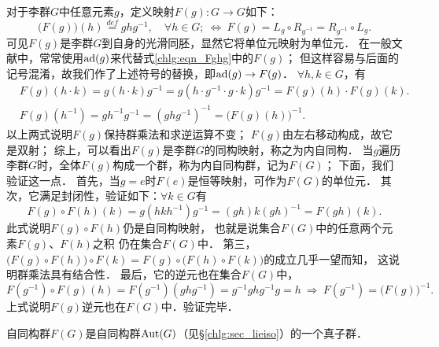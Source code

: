 对于李群$G$中任意元素$g$，定义映射$F(g):G\to G$如下：
\begin{equation}\label{chlg:eqn_Fghg}
    \bigl(F(g)\bigr) (h) \overset{def}{=} g h g^{-1},\quad \forall h\in G;
    \ \Leftrightarrow \
    F(g) = L_g \circ R_{g^{-1}} = R_{g^{-1}}\circ L_g .
\end{equation}
可见$F(g)$是李群$G$到自身的光滑同胚，显然它将单位元映射为单位元．
在一般文献中，常常使用${\rm ad}(g)$来代替式\eqref{chlg:eqn_Fghg}中的$F(g)$；
但这样容易与后面的记号混淆，故我们作了上述符号的替换，即${\rm ad}(g) \to F(g)$．
$\forall h,k\in G$，有
\begin{align}
    &F(g) (h\cdot k) = g(h\cdot k)g^{-1}=g(h\cdot g^{-1} \cdot g\cdot k)g^{-1}
    =F(g) (h) \cdot F(g) (k) . \\
    &F(g)(h^{-1}) = gh^{-1}g^{-1} = (ghg^{-1})^{-1} = \bigl(F(g) (h)\bigr)^{-1} .
\end{align}
以上两式说明$F(g)$保持群乘法和求逆运算不变；
$F(g)$由左右移动构成，故它是双射；
综上，可以看出$F(g)$是李群$G$的同构映射，称之为{\heiti 内自同构}．
当$g$遍历李群$G$时，全体$F(g)$构成一个群，称为{\heiti 内自同构群}，记为$F(G)$；
下面，我们验证这一点．
首先，当$g=e$时$F(e)$是恒等映射，可作为$F(G)$的单位元．
其次，它满足封闭性，验证如下：$\forall k\in G$有
\begin{equation}\label{chlg:eqn_tmpffkk}
    F(g)\circ F(h) (k) = g(hkh^{-1})g^{-1}
    =(gh) k (gh)^{-1} = F(gh)(k) .
\end{equation}
此式说明$F(g)\circ F(h)$仍是自同构映射，
也就是说集合$F(G)$中的任意两个元素$F(g)$、$ F(h)$之积
仍在集合$F(G)$中．
第三，$\bigl(F(g)\circ F(h)\bigr)\circ F(k)
=F(g)\circ\bigl( F(h)\circ F(k)\bigr)$的成立几乎一望而知，
这说明群乘法具有结合性．
最后，它的逆元也在集合$F(G)$中，
\begin{equation*}
    F(g^{-1})\circ F(g) (h)=F(g^{-1})(g h g^{-1} ) = g^{-1} g h g^{-1} g = h
    \ \Rightarrow \  F(g^{-1}) = \bigl( F(g)\bigr)^{-1} .
\end{equation*}
上式说明$F(g)$逆元也在$F(G)$中．验证完毕．

自同构群$F(G)$是自同构群${\rm Aut}(G)$（见\S\ref{chlg:sec_lieiso}）的一个真子群．

